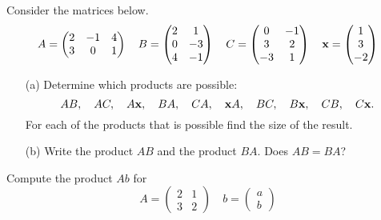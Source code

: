 \begin{problem}
    Consider the matrices below.
    \[ A = \begin{pmatrix} 2 & -1 & 4 \\ 3 & 0 & 1 \end{pmatrix} \quad B = \begin{pmatrix}
            2 & 1 \\ 0 & -3 \\ 4 & -1 \end{pmatrix} \quad C = \begin{pmatrix} 0 & -1 \\ 3
            & 2 \\ -3 & 1 \end{pmatrix} \quad {\bf x} = \begin{pmatrix} 1 \\ 3 \\ -2
    \end{pmatrix} \]
    \begin{enumerate}
        \item[(a)] Determine which products are possible:
            \[ AB, \quad AC, \quad A{\bf x}, \quad BA, \quad CA, \quad {\bf x} A, \quad BC,
            \quad B {\bf x}, \quad CB, \quad C{\bf x}. \]
            For each of the products that is possible find the size of the result.
        \item[(b)] Write the product $AB$ and the product $BA$.  Does $AB = BA$?
    \end{enumerate}
\end{problem}


\begin{problem}
    Compute the product $Ab$ for 
    \[ A = \begin{pmatrix} 2 & 1 \\ 3 & 2 \end{pmatrix} \quad b = \begin{pmatrix} a \\ b
        \end{pmatrix} \]
\end{problem}
\solution{
}


